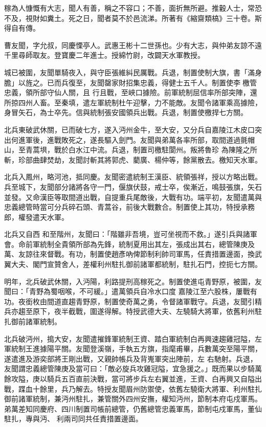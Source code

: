 \begin{pinyinscope}
 稼為人慷慨有大志，聞人有善，稱之不容口；不善，面折無所避。推轂人士，常恐
 不及，視財如糞土。死之日，聞者莫不於邑流涕。所著有《縮齋類槁》三十卷。斯得自有傳。



 曹友聞，字允叔，同慶慄亭人。武惠王彬十二世孫也。少有大志，與仲弟友諒不遠千里尋師取友。登寶慶二年進士。授綿竹尉，改闢天水軍教授。



 城已被圍，友聞單騎夜入，與守臣張維糾民厲戰。兵退，制置使制大旗，書「滿身膽」以旌之。已而兵復至，友聞罄家財招集忠義，得健士五千人。制置使李𡌴檄管忠義，領所部守仙人關，且
 行且戰，至峽口據險。前軍統制屈信率所部突陣，還所掠四州人畜。至秦填，遣左軍統制杜午迎擊，力不能敵。友聞令諸軍乘高據險，身冒矢石，為士卒先。信與統制張安國領兵出戰。兵退，制置使檄捍七方關。



 北兵東破武休關，已而破七方，遂入沔州金牛，至大安，又分兵自嘉陵江木皮口突出何進軍後，進戰敗死之，遂長驅入劍門。友聞與弟萬各率所部，取間道過氈帽山，至青蒿埧，戰於白水江中流。兵退，制置司檄駐閬州。叛將魯珍
 為陳隆之所斬，珍部曲肆焚劫，友聞討斬其將郭虎、藺廣、楊仲等，餘黨散去。檄知天水軍。



 北兵入鳳州，略河池，抵同慶。友聞密遣統制王漢臣、統領張祥，授以方略出戰。兵至城下，友聞部分諸將各守一門，偃旗伏鼓，戒士卒，俟漸近，鳴鼓張旗，矢石並發。又命漢臣等取間道出戰，自提重兵尾敵後，大戰有功。端平初，友聞遣萬與忠義總管時當可分兵碎石頭、青蒿谷，前後大戰數合。制置使上其功，特授承務郎，權發遣天水軍。



 北兵又自西
 和至階州，友聞曰：「階雖非吾境，豈可坐視而不救。」遂引兵與諸軍會。命前軍統制全貴領所部為先鋒，統制夏用出其左，張成出其右，總管陳庚及萬、友諒往來督戰。有功，制置使趙彥吶俾節制利帥司軍馬，任責措置邊面，換武翼大夫、閣門宣贊舍人，差權利州駐扎御前諸軍都統制，駐扎石門，控扼七方關。



 明年，北兵破武休關，入沔陽，利路提刑高稼死之。制置使進屯青野原，被圍，友聞曰：「青野為蜀咽喉，不可緩。」遣萬領兵自冷水口度
 嘉陵江至六股株，屢戰有功。夜銜枚由間道直趨青野原，制置使奇萬之勇，令督諸軍戰守。兵退，友聞引精兵亦趨至原下，夜半截戰，圍遂得解。特授武德大夫、左驍騎大將軍，依舊利州駐扎御前諸軍統制。



 北兵破沔州，搗大安，友聞遣摧鋒軍統制王資、踏白軍統制白再興速趨雞冠隘，左軍統制王進據陽平關。友聞登溪嶺，手執五方旗，指麾甫畢，兵數萬突至陽平關，遂遣進及游奕部將王剛出戰，又親帥帳兵及背嵬軍突出陣前，左
 右馳射。兵退，友聞謂忠義總管陳庚及當可曰：「敵必旋兵攻雞冠隘，宜急援之。」既而果以步騎萬餘攻隘，庚以騎兵五百直前決戰，當可將步兵左右翼並進，王資、白再興又自隘出戰，蹀血十餘里，兵乃解去。特授友聞眉州防禦使，依舊左驍衛大將軍、利州駐扎御前諸軍統制，兼沔州駐扎，兼管關外四州安撫，權知沔州，節制本府屯戍軍馬。弟萬差知同慶府、四川制置司帳前總管，仍舊總管忠義軍馬，節制屯戍軍馬，董仙駐扎，專與沔、
 利兩司同共任責措置邊面。




\end{pinyinscope}
